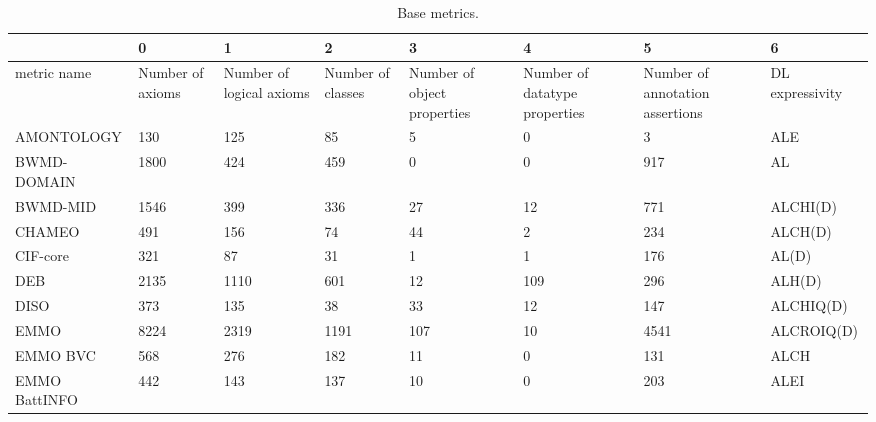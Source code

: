 \begin{table}
\centering
\caption{Base metrics.}
\label{tab:base-metrics}
\begin{tabular}{m{3.5cm}m{1cm}m{1cm}m{1cm}m{1cm}m{1cm}m{1cm}m{1cm}}
\toprule
{} &         0 &                 1 &          2 &                    3 &                      4 &                        5 &                6 \\
\midrule
metric name             &  Number of axioms &  Number of logical axioms &  Number of classes &  Number of object properties &  Number of datatype properties &  Number of annotation assertions &  DL expressivity \\
AMONTOLOGY              &       130 &               125 &         85 &                    5 &                      0 &                        3 &              ALE \\
BWMD-DOMAIN             &      1800 &               424 &        459 &                    0 &                      0 &                      917 &               AL \\
BWMD-MID                &      1546 &               399 &        336 &                   27 &                     12 &                      771 &         ALCHI(D) \\
CHAMEO                  &       491 &               156 &         74 &                   44 &                      2 &                      234 &          ALCH(D) \\
CIF-core                &       321 &                87 &         31 &                    1 &                      1 &                      176 &            AL(D) \\
DEB                     &      2135 &              1110 &        601 &                   12 &                    109 &                      296 &           ALH(D) \\
DISO                    &       373 &               135 &         38 &                   33 &                     12 &                      147 &        ALCHIQ(D) \\
EMMO                    &      8224 &              2319 &       1191 &                  107 &                     10 &                     4541 &       ALCROIQ(D) \\
EMMO BVC                &       568 &               276 &        182 &                   11 &                      0 &                      131 &             ALCH \\
EMMO BattINFO           &       442 &               143 &        137 &                   10 &                      0 &                      203 &             ALEI \\

\end{tabular}
\end{table}
